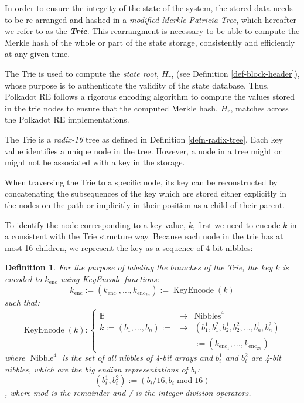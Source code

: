 \documentclass{article}
\newcommand{\assign}{:=}
\newcommand{\nosymbol}{}
\newcommand{\tmem}[1]{{\em #1\/}}
\newcommand{\tmop}[1]{\ensuremath{\operatorname{#1}}}
\newcommand{\tmstrong}[1]{\textbf{#1}}
\newcommand{\tmtextbf}[1]{{\bfseries{#1}}}
\newcommand{\tmtextit}[1]{{\itshape{#1}}}
\newtheorem{definition}{Definition}
\providecommand{\nosymbol}{}
\providecommand{\tmem}[1]{\tmtextit{#1}}
\providecommand{\tmop}[1]{\ensuremath{\mathrm{#1}}}
\providecommand{\tmstrong}[1]{\tmtextbf{#1}}
\providecommand{\tmtextbf}[1]{\tmtextbf{#1}}
\providecommand{\tmtextit}[1]{\tmtextit{#1}}
\newtheorem{definition}{Definition}
\begin{document}
In order to ensure the integrity of the state of the system, the stored data
needs to be re-arranged and hashed in a {\tmem{modified Merkle Patricia
Tree}}, which hereafter we refer to as the {\tmem{{\tmstrong{Trie}}}}. This
rearrangment is necessary to be able to compute the Merkle hash of the whole
or part of the state storage, consistently and efficiently at any given time.

The Trie is used to compute the {\tmem{state root}}, $H_r$, (see Definition
\ref{def-block-header}), whose purpose is to authenticate the validity of the
state database. Thus, Polkadot RE follows a rigorous encoding algorithm to
compute the values stored in the trie nodes to ensure that the computed Merkle
hash, $H_r$, matches across the Polkadot RE implementations.

The Trie is a {\tmem{radix-16}} tree as defined in Definition
\ref{defn-radix-tree}. Each key value identifies a unique node in the tree.
However, a node in a tree might or might not be associated with a key in the
storage.

When traversing the Trie to a specific node, its key can be reconstructed by
concatenating the subsequences of the key which are stored either explicitly
in the nodes on the path or implicitly in their position as a child of their
parent.

To identify the node corresponding to a key value, $k$, first we need to
encode $k$ in a consistent with the Trie structure way. Because each node in
the trie has at most 16 children, we represent the key as a sequence of 4-bit
nibbles:

\begin{definition}
  For the purpose of labeling the branches of the Trie, the key $k$ is encoded
  to $k_{\tmop{enc}}$ using KeyEncode functions:
  \begin{equation}
    k_{\tmop{enc}} \assign (k_{\tmop{enc}_1}, \ldots, k_{\tmop{enc}_{2 n}})
    \assign \tmop{KeyEncode} (k) \label{key-encode-in-trie}
  \end{equation}
  such that:
  \[ \tmop{KeyEncode} (k) : \left\{ \begin{array}{lll}
       \mathbb{B}^{\nosymbol} & \rightarrow & \tmop{Nibbles}^4\\
       k \assign (b_1, \ldots, b_n) \assign & \mapsto & (b^1_1, b^2_1, b_2^1,
       b^2_2, \ldots, b^1_n, b^2_n)\\
       &  & \assign (k_{\tmop{enc}_1}, \ldots, k_{\tmop{enc}_{2 n}})
     \end{array} \right. \]
  where $\tmop{Nibble}^4$ is the set of all nibbles of 4-bit arrays and
  $b^1_i$ and $b^2_i$ are 4-bit nibbles, which are the big endian
  representations of $b_i$:
  \[ (b^1_i, b^2_i) \assign (b_i / 16, b_i \tmop{mod} 16) \]
  , where mod is the remainder and / is the integer division operators.
\end{definition}
\end{document}
